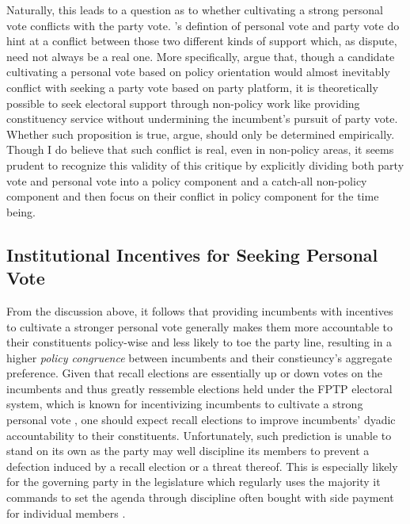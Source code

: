 \documentclass{article}
\begin{document}
			
			Naturally, this leads to a question as to
			whether cultivating a strong personal vote
			conflicts with the party vote.
			\citeauthor{cainPersonalVoteConstituency1987}'s
			\autocite*{cainPersonalVoteConstituency1987}
			defintion of personal vote and party vote
			do
			hint at a conflict between those two different kinds of support
			which,
			as
			\citeauthor{carseyRethinkingNormalVote2017}
			\autocite*{carseyRethinkingNormalVote2017}
			dispute,
			need not always be a real one.
			More specifically,
			\citeauthor{carseyRethinkingNormalVote2017}
			\autocite*{carseyRethinkingNormalVote2017}
			argue that,
			though a candidate cultivating a personal vote based on policy orientation
			would almost inevitably conflict with seeking a party vote based on party platform,
			it is theoretically possible to
			seek electoral support through non-policy work like providing constituency service
			without undermining the incumbent's pursuit of party vote.
			Whether such proposition is true,
			\citeauthor{carseyRethinkingNormalVote2017}
			\autocite*{carseyRethinkingNormalVote2017}
			argue,
			should only be determined empirically.
			Though I do believe that such conflict is real, even in non-policy areas,
			it seems prudent
			to recognize this validity of this critique 
			by explicitly dividing both party vote and personal vote into
			a
			policy component
			and a
			catch-all
			non-policy component
			and
			then
			focus on their conflict in policy component for the time being.
			
			
		\subsection*{Institutional Incentives for Seeking Personal Vote}
			
			From the discussion above,
			it follows that providing incumbents with incentives to cultivate a stronger personal vote
			generally makes them more accountable to their constituents policy-wise and
			less likely to toe
			the party line,
			resulting in a higher \textit{policy congruence} between incumbents and their constieuncy's aggregate preference.
			Given that recall elections are essentially
			up or down votes on the incumbents
			and thus greatly ressemble elections held under the
			FPTP electoral system,
			which is known for incentivizing incumbents to cultivate a strong personal vote
			\autocite{careyIncentivesCultivatePersonal1995},
			one should expect recall elections
			to improve incumbents' dyadic accountability to their constituents.
			Unfortunately,
			such prediction is unable to stand on its own
			as the party may well discipline
			its members to prevent a defection induced by a recall election or a threat thereof.
			This is especially likely for the governing party in the legislature
			which
			regularly
			uses the majority it commands to set the agenda
			through discipline often bought with
			side payment for individual members
			\autocite{coxSettingAgendaResponsible2005}.
			
\end{document}
